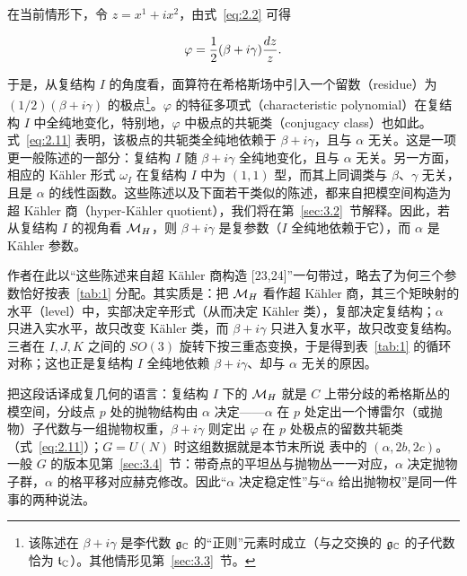 在当前情形下，令 $z=x^1+ix^2$，由式~\eqref{eq:2.2} 可得

\setcounter{equation}{10}
\begin{equation}\label{eq:2.11}
  \varphi = {1\over 2}(\beta+i\gamma){dz\over z}.
\end{equation}

于是，从复结构 $I$ 的角度看，面算符在希格斯场中引入一个留数（residue）为 $(1/2)(\beta+i\gamma)$ 的极点\footnote{该陈述在 $\beta+i\gamma$ 是李代数 ${\mathfrak g}_{\mathbb{C}}$ 的“正则”元素时成立（与之交换的 ${\mathfrak g}_{\mathbb{C}}$ 的子代数恰为 ${\mathfrak t}_{\mathbb{C}}$）。其他情形见第~\ref{sec:3.3}~节。}。$\varphi$ 的特征多项式（characteristic polynomial）在复结构 $I$ 中全纯地变化，特别地，$\varphi$ 中极点的共轭类（conjugacy class）也如此。式~\eqref{eq:2.11} 表明，该极点的共轭类全纯地依赖于 $\beta+i\gamma$，且与 $\alpha$ 无关。这是一项更一般陈述的一部分：复结构 $I$ 随 $\beta+i\gamma$ 全纯地变化，且与 $\alpha$ 无关。另一方面，相应的 Kähler 形式 $\omega_I$ 在复结构 $I$ 中为 $(1,1)$ 型，而其上同调类与 $\beta$、$\gamma$ 无关，且是 $\alpha$ 的线性函数。这些陈述以及下面若干类似的陈述，都来自把模空间构造为超 Kähler 商（hyper-Kähler quotient）\cite{ref23,ref24}，我们将在第~\ref{sec:3.2}~节解释。因此，若从复结构 $I$ 的视角看 ${{\mathcal{M}}_H}$，则 $\beta+i\gamma$ 是复参数（$I$ 全纯地依赖于它），而 $\alpha$ 是 Kähler 参数。
\begin{yizhu}[含糊点拨]
作者在此以“这些陈述来自超 Kähler 商构造 [23,24]”一句带过，略去了为何三个参数恰好按表~\ref{tab:1} 分配。其实质是：把 ${{\mathcal{M}}_H}$ 看作超 Kähler 商，其三个矩映射的水平（level）中，实部决定辛形式（从而决定 Kähler 类），复部决定复结构；$\alpha$ 只进入实水平，故只改变 Kähler 类，而 $\beta+i\gamma$ 只进入复水平，故只改变复结构。三者在 $I,J,K$ 之间的 $SO(3)$ 旋转下按三重态变换，于是得到表~\ref{tab:1} 的循环对称；这也正是复结构 $I$ 全纯地依赖 $\beta+i\gamma$、却与 $\alpha$ 无关的原因。
\end{yizhu}

\begin{yizhu}[物理图像补充]
把这段话译成复几何的语言：复结构 $I$ 下的 ${{\mathcal{M}}_H}$ 就是 $C$ 上带分歧的希格斯丛的模空间，分歧点 $p$ 处的抛物结构由 $\alpha$ 决定——$\alpha$ 在 $p$ 处定出一个博雷尔（或抛物）子代数与一组抛物权重，$\beta+i\gamma$ 则定出 $\varphi$ 在 $p$ 处极点的留数共轭类（式~\eqref{eq:2.11}）；$G=U(N)$ 时这组数据就是本节末所说 \cite{ref22} 表中的 $(\alpha,2b,2c)$。一般 $G$ 的版本见第~\ref{sec:3.4}~节：带奇点的平坦丛与抛物丛一一对应，$\alpha$ 决定抛物子群，$\alpha$ 的格平移对应赫克修改。因此“$\alpha$ 决定稳定性”与“$\alpha$ 给出抛物权”是同一件事的两种说法。
\end{yizhu}


